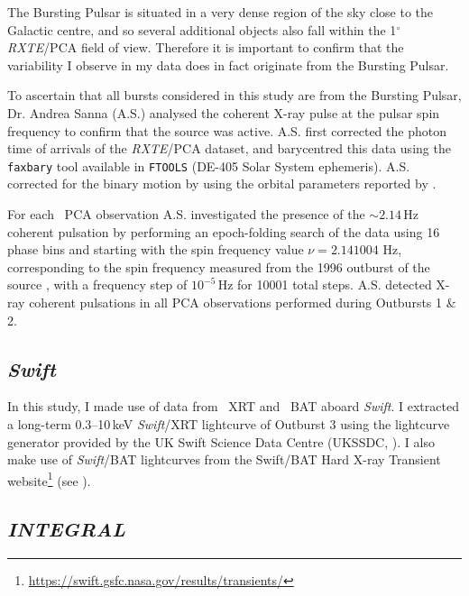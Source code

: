 \par The Bursting Pulsar is situated in a very dense region of the sky close to the Galactic centre, and so several additional objects also fall within the 1$^\circ$ \indexpca\textit{RXTE}/PCA field of view.  Therefore it is important to confirm that the variability I observe in my data does in fact originate from the Bursting Pulsar.
\par To ascertain that all bursts considered in this study are from the Bursting Pulsar, Dr. Andrea Sanna (\textsf{A.S.}) analysed the coherent X-ray pulse at the pulsar spin frequency to confirm that the source was active.  \textsf{A.S.} first corrected the photon time of arrivals of the \indexpca\textit{RXTE}/PCA dataset, and barycentred this data using the \texttt{faxbary} tool available in \texttt{FTOOLS} (DE-405 Solar System ephemeris).  \textsf{A.S.} corrected for the binary motion by using the orbital parameters reported by \citet{Finger_Pulse}.
\par For each \indexpca\ PCA observation \textsf{A.S.} investigated the presence of the $\sim 2.14$\,Hz coherent pulsation by performing an epoch-folding search of the data using 16 phase bins and starting with the spin frequency value $\nu=2.141004$ Hz, corresponding to the spin frequency measured from the 1996 outburst of the source \citep{Finger_Pulse}, with a frequency step of $10^{-5}$\,Hz for 10001 total steps. \textsf{A.S.} detected X-ray coherent pulsations in all PCA observations performed during Outbursts 1 \& 2.

\subsection{\textit{Swift}}
\par In this study, I made use of data from \indexxrt\ XRT and \indexbat\ BAT aboard \indexswift\textit{Swift}.  I extracted a long-term 0.3--10\,keV \textit{Swift}/XRT lightcurve of Outburst 3 using the lightcurve generator provided by the UK Swift Science Data Centre (UKSSDC, \citealp{Evans_Swift1}).  I also make use of \textit{Swift}/BAT lightcurves from the Swift/BAT Hard X-ray Transient website\footnote{\url{https://swift.gsfc.nasa.gov/results/transients/}} (see \citealp{Krimm_BAT}).

\subsection{\textit{INTEGRAL}}

